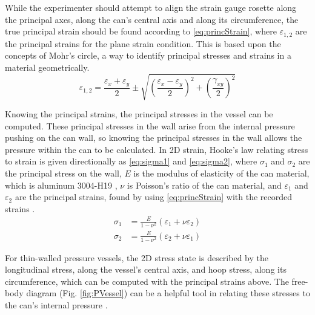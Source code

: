 \documentclass[10pt,journal,letterpaper]{IEEEtran}
\begin{document}
While the experimenter should attempt to align the strain gauge rosette along the principal axes, along the can's central axis and along its circumference, the true principal strain should be found according to \eqref{eq:princStrain}, where $\varepsilon_{1,2}$ are the principal strains for the plane strain condition.
This is based upon the concepts of Mohr’s circle, a way to identify principal stresses and strains in a material geometrically.
\begin{equation}
\label{eq:princStrain}
\varepsilon_{1,2}=\frac{\varepsilon_x+\varepsilon_y}{2} \pm \sqrt{\left(\frac{\varepsilon_x-\varepsilon_y}{2}\right)^2+\left(\frac{\gamma_{xy}}{2}\right)^2}
\end{equation}

Knowing the principal strains, the principal stresses in the vessel can be computed.
These principal stresses in the wall arise from the internal pressure pushing on the can wall, so knowing the principal stresses in the wall allows the pressure within the can to be calculated.
In 2D strain, Hooke's law relating stress to strain is given directionally as \eqref{eq:sigma1} and \eqref{eq:sigma2}, where $\sigma_{1}$ and $\sigma_{2}$ are the principal stress on the wall, $E$ is the modulus of elasticity of the can material, which is aluminum 3004-H19 \cite{b2}, $\nu$ is Poisson’s ratio of the can material, and $\varepsilon_{1}$ and $\varepsilon_{2}$ are the principal strains, found by using \eqref{eq:princStrain} with the recorded strains \cite{b1}.
\begin{subequations}
\label{eq:sigmas}
\begin{align}
\sigma_1&=\frac{E}{1-\nu^2}\left(\varepsilon_1+\nu\varepsilon_2\right) \label{eq:sigma1} \\
\sigma_2&=\frac{E}{1-\nu^2}\left(\varepsilon_2+\nu\varepsilon_1\right) \label{eq:sigma2}
\end{align}
\end{subequations}

For thin-walled pressure vessels, the 2D stress state is described by the longitudinal stress, along the vessel's central axis, and hoop stress, along its circumference, which can be computed with the principal strains above.
The free-body diagram (Fig. \ref{fig:PVessel}) can be a helpful tool in relating these stresses to the can's internal pressure \cite{b1}.
\end{document}
